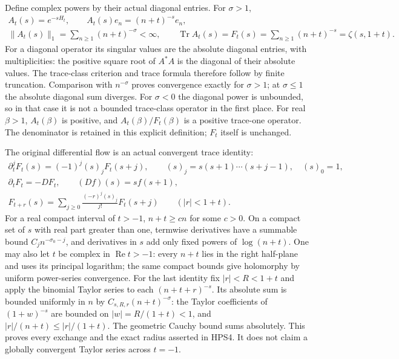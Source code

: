Define complex powers by their actual diagonal entries.
For $\sigma>1$,
\begin{equation}\tag{HPS3}
\begin{gathered}
 A_t(s)=e^{-sH_t},\qquad A_t(s)e_n=(n+t)^{-s}e_n,\\
 \|A_t(s)\|_1=\sum_{n\ge1}(n+t)^{-\sigma}<\infty,\qquad
 \operatorname{Tr}A_t(s)
       =F_t(s)=\sum_{n\ge1}(n+t)^{-s}=\zeta(s,1+t).
\end{gathered}
\end{equation}
For a diagonal operator its singular values are the
absolute diagonal entries, with multiplicities: the
positive square root of $A^*A$ is the diagonal of
their absolute values. The trace-class criterion and
trace formula therefore follow by finite truncation.
Comparison with $n^{-\sigma}$ proves convergence
exactly for $\sigma>1$; at $\sigma\le1$ the absolute
diagonal sum diverges. For $\sigma<0$ the diagonal
power is unbounded, so in that case it is not a bounded
trace-class operator in the first place.
For real $\beta>1$, $A_t(\beta)$ is positive, and
$A_t(\beta)/F_t(\beta)$ is a positive trace-one
operator. The denominator is retained in this
explicit definition; $F_t$ itself is unchanged.

The original differential flow is an actual convergent
trace identity:
\begin{equation}\tag{HPS4}
\begin{gathered}
 \partial_t^jF_t(s)=(-1)^j(s)_jF_t(s+j),\qquad
 (s)_j=s(s+1)\cdots(s+j-1),\quad(s)_0=1,\\
 \partial_tF_t=-DF_t,\qquad (Df)(s)=sf(s+1),\\
 F_{t+r}(s)=\sum_{j\ge0}
       \frac{(-r)^j(s)_j}{j!}F_t(s+j)
                         \qquad(|r|<1+t).
\end{gathered}
\end{equation}
For a real compact interval of $t>-1$,
$n+t\ge c n$ for some $c>0$. On a compact set of
$s$ with real part greater than one, termwise
derivatives have a summable bound
$C_j n^{-\sigma_0-j}$, and derivatives in $s$ add
only fixed powers of $\log(n+t)$.
One may also let $t$ be complex in $\operatorname{Re}t>-1$:
every $n+t$ lies in the right half-plane and uses
its principal logarithm; the same compact bounds
give holomorphy by uniform power-series convergence.
For the last identity fix $|r|<R<1+t$ and apply the
binomial Taylor series to each $(n+t+r)^{-s}$.
Its absolute sum is bounded uniformly in $n$ by
$C_{s,R,r}(n+t)^{-\sigma}$: the Taylor coefficients
of $(1+w)^{-s}$ are bounded on $|w|=R/(1+t)<1$,
and $|r|/(n+t)\le|r|/(1+t)$.
The geometric Cauchy bound sums absolutely.
This proves every exchange and the exact radius
asserted in HPS4. It does not claim a globally
convergent Taylor series across $t=-1$.

